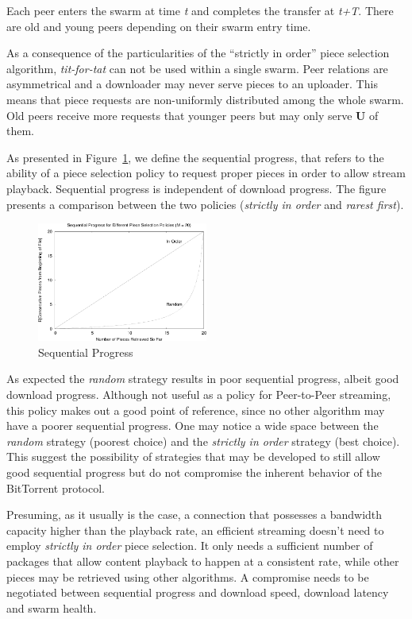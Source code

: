 Each peer enters the swarm at time \textit{t} and completes the transfer at
\textit{t+T}. There are old and young peers depending on their swarm entry
time.

As a consequence of the particularities of the ``strictly in order'' piece
selection algorithm, \textit{tit-for-tat} can not be used within a single
swarm. Peer relations are asymmetrical and a downloader may never serve
pieces to an uploader. This means that piece requests are non-uniformly
distributed among the whole swarm. Old peers receive more requests that
younger peers but may only serve \textbf{U} of them.

As presented in Figure~\ref{fig:multimedia-dist:sequential-progress}, we define the
sequential progress, that
refers to the ability of a piece selection policy to request proper pieces in
order to allow stream playback. Sequential progress is independent of download
progress. The figure presents a comparison between the two policies
(\textit{strictly in order} and \textit{rarest first}).

\begin{figure}
  \centering
  \includegraphics[width=0.5\textwidth]{src/img/multimedia-dist/sequential-progress}
  \caption{Sequential Progress}
  \label{fig:multimedia-dist:sequential-progress}
\end{figure}

As expected the \textit{random} strategy results in poor sequential progress,
albeit good download progress. Although not useful as a policy for
Peer-to-Peer streaming, this policy makes out a good point of reference, since
no other algorithm may have a poorer sequential progress. One may notice a
wide space between the \textit{random} strategy (poorest choice) and the
\textit{strictly in order} strategy (best choice). This suggest the
possibility of strategies that may be developed to still allow good
sequential progress but do not compromise the inherent behavior of the
BitTorrent protocol.

Presuming, as it usually is the case, a connection that possesses a bandwidth
capacity higher than the playback rate, an efficient streaming doesn't need to
employ \textit{strictly in order} piece selection. It only needs a sufficient
number of packages that allow content playback to happen at a consistent rate,
while other pieces may be retrieved using other algorithms. A compromise needs
to be negotiated between sequential progress and download speed, download
latency and swarm health.

